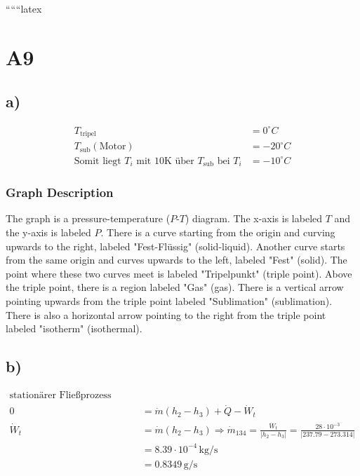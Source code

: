 
``````latex


\section*{A9}

\subsection*{a)}

\begin{align*}
    T_{\text{tripel}} &= 0^\circ C \\
    T_{\text{sub}} (\text{Motor}) &= -20^\circ C \\
    \text{Somit liegt } T_i \text{ mit 10K über } T_{\text{sub}} \text{ bei } T_i &= -10^\circ C
\end{align*}

\subsubsection*{Graph Description}

The graph is a pressure-temperature ($P$-$T$) diagram. The x-axis is labeled $T$ and the y-axis is labeled $P$. There is a curve starting from the origin and curving upwards to the right, labeled "Fest-Flüssig" (solid-liquid). Another curve starts from the same origin and curves upwards to the left, labeled "Fest" (solid). The point where these two curves meet is labeled "Tripelpunkt" (triple point). Above the triple point, there is a region labeled "Gas" (gas). There is a vertical arrow pointing upwards from the triple point labeled "Sublimation" (sublimation). There is also a horizontal arrow pointing to the right from the triple point labeled "isotherm" (isothermal).

\subsection*{b)}

\begin{align*}
    \text{stationärer Fließprozess beim Verdampfer} \\
    0 &= \dot{m} (h_2 - h_3) + \dot{Q} - \dot{W}_t \\
    \dot{W}_t &= \dot{m} (h_2 - h_3) \Rightarrow \dot{m}_{134} = \frac{\dot{W}_t}{|h_2 - h_3|} = \frac{28 \cdot 10^{-3}}{|237.79 - 273.314|} \\
    &= 8.39 \cdot 10^{-4} \, \text{kg/s} \\
    &= 0.8349 \, \text{g/s}
\end{align*}

